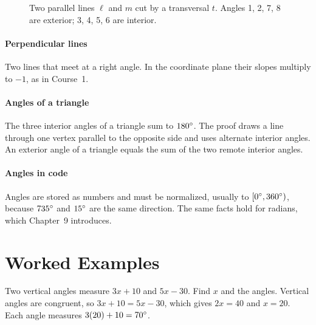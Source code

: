 \begin{figure}[H]
\centering
{}
\caption{Two parallel lines $\ell$ and $m$ cut by a transversal $t$. Angles 1, 2, 7, 8 are exterior; 3, 4, 5, 6 are interior.}
\label{fig:transversal}
\end{figure}

\paragraph{Perpendicular lines} Two lines that meet at a right angle. In the coordinate plane their slopes multiply to $-1$, as in Course~1.

\paragraph{Angles of a triangle} The three interior angles of a triangle sum to $180^\circ$. The proof draws a line through one vertex parallel to the opposite side and uses alternate interior angles. An exterior angle of a triangle equals the sum of the two remote interior angles.

\paragraph{Angles in code} Angles are stored as numbers and must be normalized, usually to $[0^\circ, 360^\circ)$, because $735^\circ$ and $15^\circ$ are the same direction. The same facts hold for radians, which Chapter~9 introduces.

\section{Worked Examples}

\begin{example}
Two vertical angles measure $3x + 10$ and $5x - 30$. Find $x$ and the angles.
\solution Vertical angles are congruent, so $3x + 10 = 5x - 30$, which gives $2x = 40$ and $x = 20$. Each angle measures $3(20) + 10 = 70^\circ$.
\end{example}

